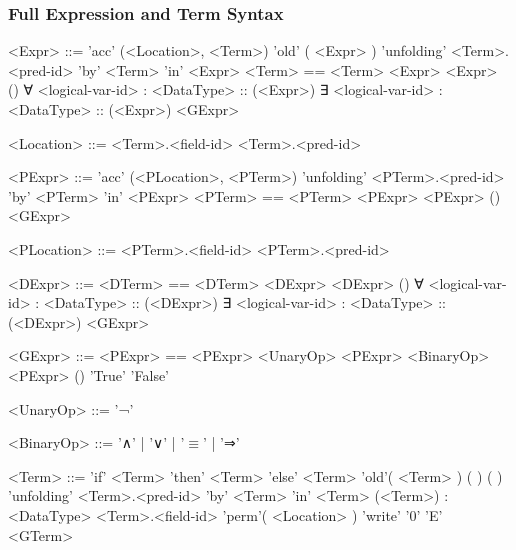 \subsubsection{Full Expression and Term Syntax}

\begin{grammar}
<Expr> ::= 'acc' (<Location>, <Term>)
	\alt 'old' ( <Expr> )
	\alt 'unfolding' <Term>.<pred-id> 'by' <Term> 'in' <Expr>
	\alt <Term> == <Term>
	\alt <unary-op> <Expr>
	\alt <binary-op> <Expr>
	\alt <dom-pred-id>()
	\alt ∀ <logical-var-id> : <DataType> :: (<Expr>)
	\alt ∃ <logical-var-id> : <DataType> :: (<Expr>)
	\alt <GExpr>

<Location> ::= <Term>.<field-id>
	\alt <Term>.<pred-id>
\end{grammar}

\begin{grammar}
<PExpr> ::= 'acc' (<PLocation>, <PTerm>)
	\alt 'unfolding' <PTerm>.<pred-id> 'by' <PTerm> 'in' <PExpr>
	\alt <PTerm> == <PTerm>
	\alt <unary-op> <PExpr>
	\alt <binary-op> <PExpr>
	\alt <dom-pred-id>()
	\alt <GExpr>

<PLocation> ::= <PTerm>.<field-id>
	\alt <PTerm>.<pred-id>
\end{grammar}

\begin{grammar}
<DExpr> ::= <DTerm> == <DTerm>
	\alt <unary-op> <DExpr>
	\alt <binary-op> <DExpr>
	\alt <dom-pred-id>()
	\alt ∀ <logical-var-id> : <DataType> :: (<DExpr>)
	\alt ∃ <logical-var-id> : <DataType> :: (<DExpr>)
	\alt <GExpr>
\end{grammar}

\begin{grammar}
<GExpr> ::= <PExpr> == <PExpr>
	\alt <UnaryOp> <PExpr>
	\alt <BinaryOp> <PExpr>
	\alt <dom-pred-id>()
	\alt 'True'
	\alt 'False'
\end{grammar}

\begin{grammar}
<UnaryOp> ::= '¬'

<BinaryOp> ::= '∧' | '∨' | '$\equiv$' | '⇒'
\end{grammar}

\begin{grammar}
<Term> ::= 'if' <Term> 'then' <Term> 'else' <Term>
	\alt 'old'( <Term> )
	\alt <func-id>(  )
	\alt <dom-func-id>(  )
	\alt 'unfolding' <Term>.<pred-id> 'by' <Term> 'in' <Term>
	\alt (<Term>) : <DataType>
	\alt <Term>.<field-id>
	\alt 'perm'( <Location> )
	\alt 'write'
	\alt '0'
	\alt  'E'
	\alt <GTerm>
\end{grammar}

